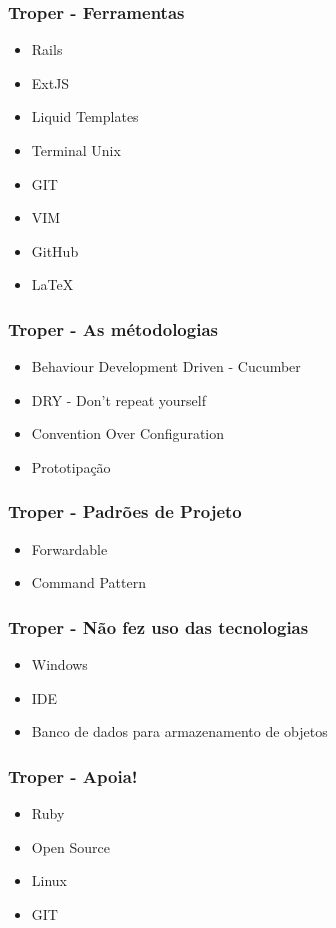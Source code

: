 \documentclass{beamer}
\begin{document}
\begin{frame} 
\frametitle{Troper - Ferramentas}
  \begin{itemize} 
    \item Rails
    \item ExtJS 
    \item Liquid Templates 
    \item Terminal Unix 
    \item GIT 
    \item VIM 
    \item GitHub 
    \item LaTeX
  \end{itemize} 
\end{frame}

\begin{frame}
\frametitle{Troper - As métodologias}
  \begin{itemize} 
    \item Behaviour Development Driven - Cucumber
    \item DRY - Don't repeat yourself 
    \item Convention Over Configuration
    \item Prototipação 
  \end{itemize} 
\end{frame}

\begin{frame}
\frametitle{Troper - Padrões de Projeto}
  \begin{itemize} 
    \item Forwardable
    \item Command Pattern 
  \end{itemize} 
\end{frame}

\begin{frame} 
\frametitle{Troper - Não fez uso das tecnologias }
  \begin{itemize} 
    \item Windows 
    \item IDE
    \item Banco de dados para armazenamento de objetos
  \end{itemize} 
\end{frame} 

\begin{frame} 
\frametitle{Troper - Apoia!}
  \begin{itemize} 
    \item Ruby 
    \item Open Source 
    \item Linux 
    \item GIT 
  \end{itemize} 
\end{frame} 
\end{document}

